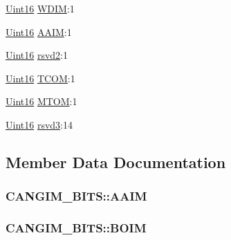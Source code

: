\begin{DoxyCompactItemize}
\item 
\hyperlink{_d_s_p2833x___device_8h_a59a9f6be4562c327cbfb4f7e8e18f08b}{Uint16} \hyperlink{struct_c_a_n_g_i_m___b_i_t_s_afc9db72696f9bd4db6d4943427d830e5}{W\+D\+I\+M}\+:1
\item 
\hyperlink{_d_s_p2833x___device_8h_a59a9f6be4562c327cbfb4f7e8e18f08b}{Uint16} \hyperlink{struct_c_a_n_g_i_m___b_i_t_s_af4613ce03afdc4880f3d8f06b3dc35f0}{A\+A\+I\+M}\+:1
\item 
\hyperlink{_d_s_p2833x___device_8h_a59a9f6be4562c327cbfb4f7e8e18f08b}{Uint16} \hyperlink{struct_c_a_n_g_i_m___b_i_t_s_a40168744ea534ad57da99966f03b95dc}{rsvd2}\+:1
\item 
\hyperlink{_d_s_p2833x___device_8h_a59a9f6be4562c327cbfb4f7e8e18f08b}{Uint16} \hyperlink{struct_c_a_n_g_i_m___b_i_t_s_a43c04cfd76cbaed7b831e097158a6bf9}{T\+C\+O\+M}\+:1
\item 
\hyperlink{_d_s_p2833x___device_8h_a59a9f6be4562c327cbfb4f7e8e18f08b}{Uint16} \hyperlink{struct_c_a_n_g_i_m___b_i_t_s_ad2b454fbdaeb4a13453db6dfded1cce9}{M\+T\+O\+M}\+:1
\item 
\hyperlink{_d_s_p2833x___device_8h_a59a9f6be4562c327cbfb4f7e8e18f08b}{Uint16} \hyperlink{struct_c_a_n_g_i_m___b_i_t_s_a9f80adc2591d35f4d4072600956dd9d3}{rsvd3}\+:14
\end{DoxyCompactItemize}


\subsection{Member Data Documentation}
\hypertarget{struct_c_a_n_g_i_m___b_i_t_s_af4613ce03afdc4880f3d8f06b3dc35f0}{}
\subsubsection[{A\+A\+I\+M}]{ C\+A\+N\+G\+I\+M\+\_\+\+B\+I\+T\+S\+::\+A\+A\+I\+M}\label{struct_c_a_n_g_i_m___b_i_t_s_af4613ce03afdc4880f3d8f06b3dc35f0}
\hypertarget{struct_c_a_n_g_i_m___b_i_t_s_a71da6fa9c238822b5ad4b5d2b78c8a1f}{}
\subsubsection[{B\+O\+I\+M}]{ C\+A\+N\+G\+I\+M\+\_\+\+B\+I\+T\+S\+::\+B\+O\+I\+M}\label{struct_c_a_n_g_i_m___b_i_t_s_a71da6fa9c238822b5ad4b5d2b78c8a1f}
\hypertarget{struct_c_a_n_g_i_m___b_i_t_s_a741b91312b599e5b43d01deabad84aa5}{}
